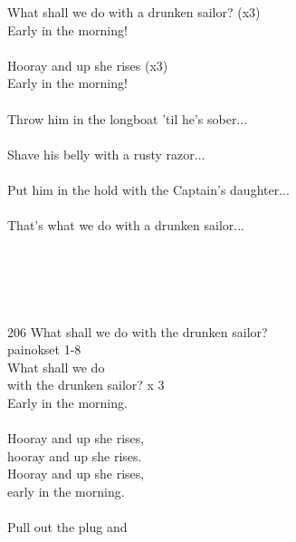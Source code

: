 
            What shall we do with a drunken sailor? (x3) \\
            Early in the morning! \\
\hspace{10mm} \\
            Hooray and up she rises (x3) \\
            Early in the morning! \\
\hspace{10mm} \\
            Throw him in the longboat 'til he's sober... \\
\hspace{10mm} \\
            Shave his belly with a rusty razor... \\
\hspace{10mm} \\
            Put him in the hold with the Captain's daughter... \\
\hspace{10mm} \\
            That’s what we do with a drunken sailor... \\
\hspace{10mm} \\
 \\
\hspace{10mm} \\
 \\
\hspace{10mm} \\
206 What shall we do with the drunken sailor? \\
painokset 1-8 \\
            What shall we do  \\
            with the drunken sailor? x 3  \\
            Early in the morning. \\
\hspace{10mm} \\
            Hooray and up she rises, \\
            hooray and up she rises.  \\
            Hooray and up she rises,  \\
            early in the morning. \\
\hspace{10mm} \\
            Pull out the plug and  \\
